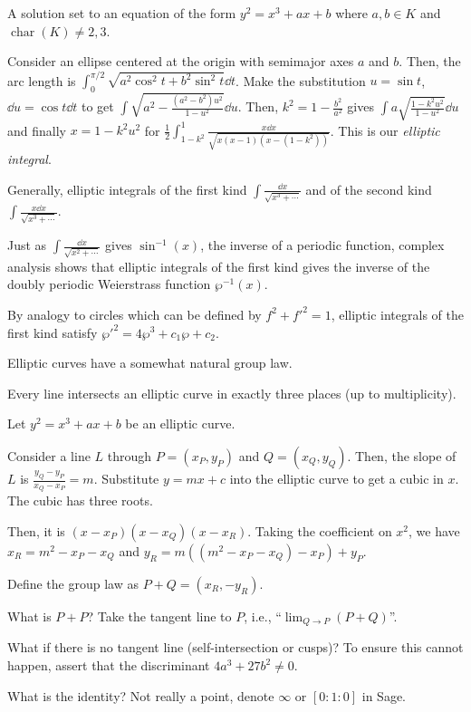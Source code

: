 \documentclass[notes]{agony}
\begin{document}
\begin{defn}
  A solution set to an equation of the form $y^2 = x^3 + ax + b$
  where $a,b \in K$ and $\operatorname{char}(K) \neq 2,3$.
\end{defn}

Consider an ellipse centered at the origin with semimajor axes $a$ and $b$.
Then, the arc length is $\int_0^{\pi/2}\sqrt{a^2\cos^2t + b^2\sin^2t} \dd{t}$.
Make the substitution $u = \sin t$, $\dd{u} = \cos t \dd{t}$ to get
$\int \sqrt{a^2 - \frac{(a^2-b^2)u^2}{1-u^2}} \dd{u}$.
Then, $k^2 = 1-\frac{b^2}{a^2}$ gives $\int a\sqrt{\frac{1-k^2u^2}{1-u^2}}\dd{u}$
and finally $x = 1-k^2u^2$ for $\frac12\int_{1-k^2}^1\frac{x\dd{x}}{\sqrt{x(x-1)(x-(1-k^2))}}$.
This is our \emph{elliptic integral}.

Generally, elliptic integrals of the first kind $\int \frac{\dd{x}}{\sqrt{x^3+\dotsb}}$
and of the second kind $\int \frac{x\dd{x}}{\sqrt{x^3+\dotsb}}$.

Just as $\int \frac{\dd{x}}{\sqrt{x^2 + \dotsb}}$ gives $\sin^{-1}(x)$,
the inverse of a periodic function, complex analysis shows that 
elliptic integrals of the first kind gives the inverse of the doubly periodic
Weierstrass function $\wp^{-1}(x)$.

By analogy to circles which can be defined by $f^2 + f'^2 = 1$,
elliptic integrals of the first kind satisfy $\wp'^2 = 4\wp^3 + c_1\wp + c_2$.

Elliptic curves have a somewhat natural group law.

\begin{lemma}
  Every line intersects an elliptic curve in exactly three places
  (up to multiplicity).
\end{lemma}
\begin{prf}
  Let $y^2 = x^3 + ax + b$ be an elliptic curve.

  Consider a line $L$ through $P = (x_P, y_P)$ and $Q = (x_Q, y_Q)$.
  Then, the slope of $L$ is $\frac{y_Q-y_P}{x_Q-x_P} = m$.
  Substitute $y = mx + c$ into the elliptic curve to get a cubic in $x$.
  The cubic has three roots.

  Then, it is $(x-x_P)(x-x_Q)(x-x_R)$.
  Taking the coefficient on $x^2$, we have $x_R = m^2 - x_P - x_Q$
  and $y_R = m((m^2-x_P-x_Q)-x_P)+y_P$.
\end{prf}

Define the group law as $P + Q = (x_R, -y_R)$.

What is $P+P$? Take the tangent line to $P$, i.e., ``$\lim_{Q \to P}(P+Q)$''.

What if there is no tangent line (self-intersection or cusps)?
To ensure this cannot happen, assert that the discriminant $4a^3 + 27b^2 \neq 0$.

What is the identity? Not really a point, denote $\infty$ or $[0:1:0]$ in Sage.
\end{document}
